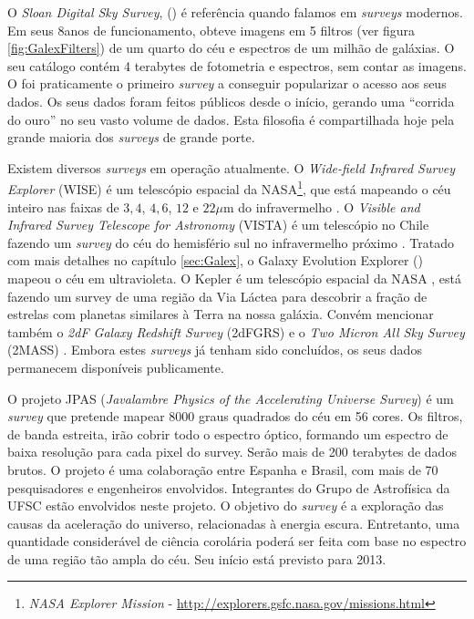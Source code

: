 O {\em Sloan Digital Sky Survey}, (\SDSS) \citep{York2000} é referência quando
falamos em {\em surveys} modernos. Em seus 8\fixme anos de funcionamento, obteve
imagens em 5 filtros (ver figura \ref{fig:GalexFilters}) de um quarto do céu e
espectros de um milhão de galáxias. O seu catálogo contém 4 terabytes de
fotometria e espectros, sem contar as imagens. O \SDSS foi praticamente o
primeiro {\em survey} a conseguir popularizar o acesso aos seus dados. Os seus
dados foram feitos públicos desde o início\citneed, gerando uma ``corrida do
ouro'' no seu vasto volume de dados. Esta filosofia é compartilhada hoje pela
grande maioria dos {\em surveys} de grande porte.

Existem diversos {\em surveys} em operação atualmente. O {\em Wide-field
Infrared Survey Explorer} (WISE) é um telescópio espacial da NASA\footnote{{\em
NASA Explorer Mission} - \url{http://explorers.gsfc.nasa.gov/missions.html}},
que está mapeando o céu inteiro nas faixas de $3,4$, $4,6$, $12$ e $22\mu$m do
infravermelho \citep{Wright2010}. O {\em Visible and Infrared Survey Telescope
for Astronomy} (VISTA) é um telescópio no Chile fazendo um {\em survey} do céu
do hemisfério sul no infravermelho próximo \citep{Born2010}. Tratado com mais
detalhes no capítulo \ref{sec:Galex}, o {Galaxy Evolution Explorer} (\galex)
mapeou o céu em ultravioleta. O Kepler é um telescópio espacial da NASA
\citep{Borucki2010}, está fazendo um survey de uma região da Via Láctea para
descobrir a fração de estrelas com planetas similares à Terra na nossa galáxia.
Convém mencionar também o {\em 2dF Galaxy Redshift Survey} (2dFGRS)
\citep{Colless1999} e o {\em Two Micron All Sky Survey} (2MASS)
\citep{Skrutskie2006}. Embora estes {\em surveys} já tenham sido concluídos, os
seus dados permanecem disponíveis publicamente.

O projeto JPAS ({\em Javalambre Physics of the Accelerating Universe Survey}) é
um {\em survey} que pretende mapear $8000$ graus quadrados do céu em 56
cores\citep{Benitez2009}. Os filtros, de banda estreita, irão cobrir todo o
espectro óptico, formando um espectro de baixa resolução para cada pixel do
survey. Serão mais de 200 terabytes de dados brutos\citneed. O projeto é uma
colaboração entre Espanha e Brasil, com mais de 70 pesquisadores e engenheiros
envolvidos. Integrantes do Grupo de Astrofísica da UFSC estão envolvidos neste
projeto\citneed. O objetivo do {\em survey} é a exploração das causas da
aceleração do universo, relacionadas à energia escura. Entretanto, uma
quantidade considerável de ciência corolária poderá ser feita com base no
espectro de uma região tão ampla do céu. Seu início está previsto para 2013.

